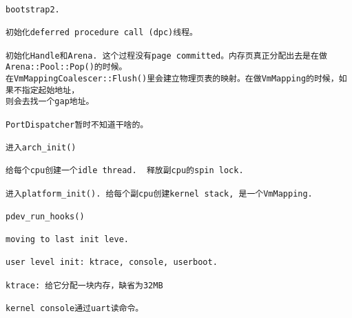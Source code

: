 \begin{verbatim}
bootstrap2.

初始化deferred procedure call (dpc)线程。

初始化Handle和Arena. 这个过程没有page committed。内存页真正分配出去是在做Arena::Pool::Pop()的时候。
在VmMappingCoalescer::Flush()里会建立物理页表的映射。在做VmMapping的时候，如果不指定起始地址，
则会去找一个gap地址。

PortDispatcher暂时不知道干啥的。

进入arch_init()

给每个cpu创建一个idle thread.  释放副cpu的spin lock.

进入platform_init(). 给每个副cpu创建kernel stack, 是一个VmMapping.

pdev_run_hooks()

moving to last init leve.

user level init: ktrace, console, userboot.

ktrace: 给它分配一块内存，缺省为32MB

kernel console通过uart读命令。

\end{verbatim}














